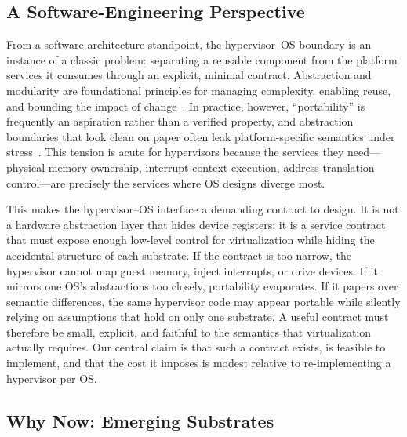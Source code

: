 \subsection{A Software-Engineering Perspective}

From a software-architecture standpoint, the hypervisor--OS boundary is an
instance of a classic problem: separating a reusable component from the platform
services it consumes through an explicit, minimal contract. Abstraction and
modularity are foundational principles for managing complexity, enabling reuse,
and bounding the impact of change~\cite{shaw2025abstractions, wan2023software}.
In practice, however, ``portability'' is frequently an aspiration rather than a
verified property, and abstraction boundaries that look clean on paper often
leak platform-specific semantics under stress~\cite{mince2023illusion}. This
tension is acute for hypervisors because the services they need---physical
memory ownership, interrupt-context execution, address-translation control---are
precisely the services where OS designs diverge most.

This makes the hypervisor--OS interface a demanding contract to design. It is
not a hardware abstraction layer that hides device registers; it is a service
contract that must expose enough low-level control for virtualization while
hiding the accidental structure of each substrate. If the contract is too
narrow, the hypervisor cannot map guest memory, inject interrupts, or drive
devices. If it mirrors one OS's abstractions too closely, portability
evaporates. If it papers over semantic differences, the same hypervisor code may
appear portable while silently relying on assumptions that hold on only one
substrate. A useful contract must therefore be small, explicit, and faithful to
the semantics that virtualization actually requires. Our central claim is that
such a contract exists, is feasible to implement, and that the cost it imposes
is modest relative to re-implementing a hypervisor per OS.

\subsection{Why Now: Emerging Substrates}


